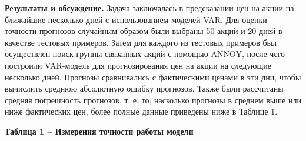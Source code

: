 {{\bfseries Результаты и обсуждение.} Задача заключалась в предсказании цен
на акции на ближайшие несколько дней с использованием моделей VAR. Для
оценки точности прогнозов случайным образом были выбраны 50 акций и 20
дней в качестве тестовых примеров. Затем для каждого из тестовых
примеров был осуществлен поиск группы связанных акций с помощью ANNOY,
после чего построили VAR-модель для прогнозирования цен на акции на
следующие несколько дней. Прогнозы сравнивались с фактическими ценами в
эти дни, чтобы вычислить среднюю абсолютную ошибку прогнозов. Также были
рассчитаны средняя погрешность прогнозов, т. е. то, насколько прогнозы в
среднем выше или ниже фактических цен, более полные данные приведены
ниже в Таблице 1.

{\bfseries Таблица 1 -- Измерения точности работы модели}


}
